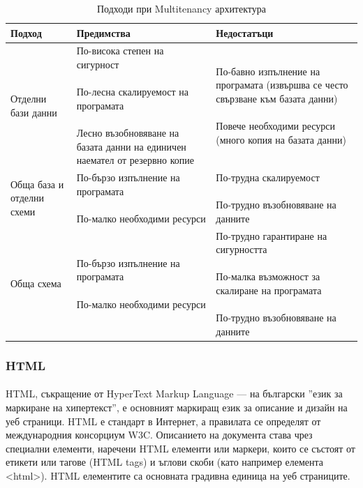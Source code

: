 \documentclass[pdftex,14pt,a4paper]{extreport}
\begin{document}
\begin{table}[h!]
  \begin{tabular}{|p{2.7cm}|p{5cm}|p{5cm}|}
    \hline
    Подход & Предимства & Недостатъци \\
    \hline
    Отделни бази данни &
    \parbox[t]{5cm}{
      По-висока степен на сигурност \\\\
      По-лесна скалируемост на програмата \\\\
      Лесно възобновяване на базата данни на единичен наемател от резервно копие
    } &
    \parbox[t]{5cm}{
      По-бавно изпълнение на програмата (извършва се често свързване към базата данни) \\\\
      Повече необходими ресурси (много копия на базата данни)
    }
    \\
    \hline
    Обща база и отделни схеми &
    \parbox[t]{5cm}{
      По-бързо изпълнение на програмата \\\\
      По-малко необходими ресурси
    }
    &
    \parbox[t]{5cm}{
      По-трудна скалируемост \\\\
      По-трудно възобновяване на данните
    }
    \\
    \hline
    Обща схема &
    \parbox[t]{5cm}{
     По-бързо изпълнение на програмата \\\\
     По-малко необходими ресурси
    }
    &
    \parbox[t]{5cm}{
      По-трудно гарантиране на сигурността \\\\
      По-малка възможност за скалиране на програмата \\\\
      По-трудно възобновяване на данните
    }
    \\
    \hline
  \end{tabular}
  \caption {Подходи при Multitenancy архитектура}
\end{table}
\subsubsection {HTML}
\paragraph {}
HTML, съкращение от HyperText Markup Language — на български ''език за маркиране на хипертекст'', е основният маркиращ език за описание и дизайн на уеб страници. HTML е стандарт в Интернет, а правилата се определят от международния консорциум W3C. Описанието на документа става чрез специални елементи, наречени HTML елементи или маркери, които се състоят от етикети или тагове (HTML tags) и ъглови скоби (като например елемента <html>). HTML елементите са основната градивна единица на уеб страниците.
\end{document}

